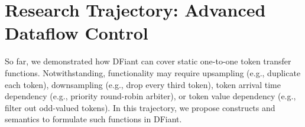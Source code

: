 
\chapter{Research Trajectory: Advanced Dataflow Control}
\label{trajectory_dataflow}
So far, we demonstrated how DFiant can cover static one-to-one token transfer functions. Notwithstanding, functionality may require upsampling (e.g., duplicate each token), downsampling (e.g., drop every third token), token arrival time dependency (e.g., priority round-robin arbiter), or token value dependency (e.g., filter out odd-valued tokens). In this trajectory, we propose constructs and semantics to formulate such functions in DFiant.

